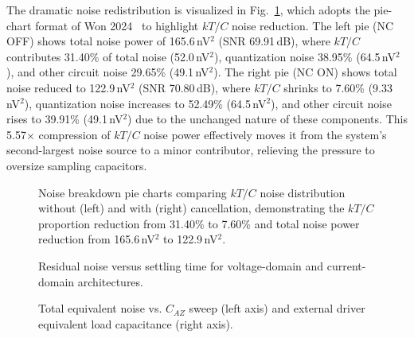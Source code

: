 \documentclass[journal]{IEEEtran}
\begin{document}
The dramatic noise redistribution is visualized in Fig.~\ref{fig:noise_breakdown}, which adopts the pie-chart format of Won 2024~\cite{won2024esserc} to highlight $kT/C$ noise reduction. The left pie (NC OFF) shows total noise power of 165.6\,nV$^2$ (SNR 69.91\,dB), where $kT/C$ contributes 31.40\% of total noise (52.0\,nV$^2$), quantization noise 38.95\% (64.5\,nV$^2$), and other circuit noise 29.65\% (49.1\,nV$^2$). The right pie (NC ON) shows total noise reduced to 122.9\,nV$^2$ (SNR 70.80\,dB), where $kT/C$ shrinks to 7.60\% (9.33\,nV$^2$), quantization noise increases to 52.49\% (64.5\,nV$^2$), and other circuit noise rises to 39.91\% (49.1\,nV$^2$) due to the unchanged nature of these components. This 5.57$\times$ compression of $kT/C$ noise power effectively moves it from the system's second-largest noise source to a minor contributor, relieving the pressure to oversize sampling capacitors.

\begin{figure}[!t]
\centering
{}
\caption{Noise breakdown pie charts comparing $kT/C$ noise distribution without (left) and with (right) cancellation, demonstrating the $kT/C$ proportion reduction from 31.40\% to 7.60\% and total noise power reduction from 165.6\,nV$^2$ to 122.9\,nV$^2$.}
\label{fig:noise_breakdown}
\end{figure}

\begin{figure}[!t]
\centering
{}
\caption{Residual noise versus settling time for voltage-domain and current-domain architectures.}
\label{fig:noise_settling}
\end{figure}

\begin{figure}[!t]
\centering
{}
\caption{Total equivalent noise vs. $C_{AZ}$ sweep (left axis) and external driver equivalent load capacitance (right axis).}
\label{fig:caz_sweep}
\end{figure}
\end{document}
